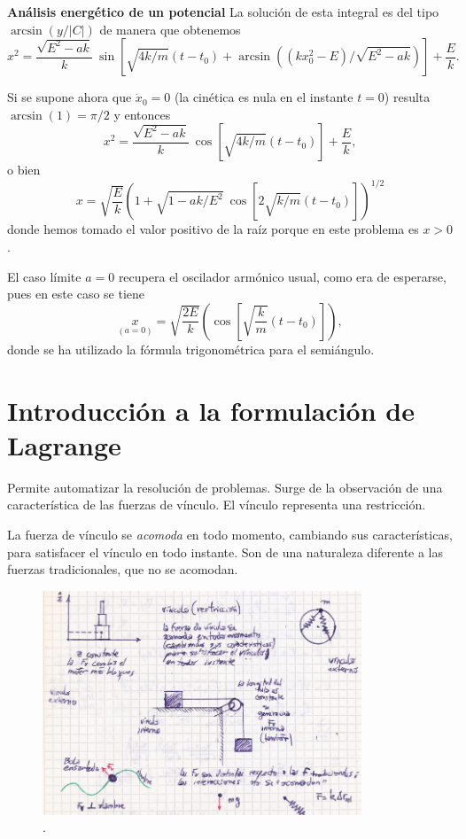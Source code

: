 \documentclass[10pt,oneside]{CBFT_book}
\begin{document}
\begin{ejemplo}{\bfseries Análisis energético de un potencial }
La solución de esta integral es del tipo $ \arcsin(y/|C|) $ de manera que obtenemos
\[
	x^2 = \frac{\sqrt{E^2 - ak}}{k} \: \sin 
	\left[ \sqrt{4k/m}(t-t_0) + \arcsin ( (kx_0^2- E)/\sqrt{E^2 -ak }) \right] + \frac{E}{k}.
\]

Si se supone ahora que $ \dot{x}_0 = 0 $ (la cinética es nula en el instante $t=0$) resulta $ \arcsin(1) = \pi/2 $ 
y entonces 
\[
	x^2 = \frac{\sqrt{E^2 - ak}}{k} \: \cos \left[ \sqrt{4k/m}(t-t_0) \right] + \frac{E}{k},
\]
o bien 
\[
	x = \sqrt{ \frac{E}{k} } \left( 1 + \sqrt{1 - ak/E^2}  \: \cos \left[ 2\sqrt{k/m}(t-t_0) \right] \right)^{1/2}
\]
donde hemos tomado el valor positivo de la raíz porque en este problema es $ x > 0 $ .

El caso límite $ a = 0 $ recupera el oscilador armónico usual, como era de esperarse, pues en este caso se tiene
\[
	\underset{(a = 0)}{x} = \sqrt{ \frac{2E}{k} } \left( \cos \left[ \sqrt{\frac{k}{m}}(t-t_0) \right] \right),
\]
donde se ha utilizado la fórmula trigonométrica para el semiángulo.

\end{ejemplo}

\section{Introducción a la formulación de Lagrange}

Permite automatizar la resolución de problemas. Surge de la observación de una característica de las fuerzas de vínculo.
El vínculo representa una restricción.

La fuerza de vínculo se {\it acomoda} en todo momento, cambiando sus características, para satisfacer el vínculo en 
todo instante. Son de una naturaleza diferente a las fuerzas tradicionales, que no se acomodan.

\begin{figure}[!ht]
	\includegraphics[width=0.85\textwidth]{images/fig_mc_vinculos_varios.jpg}	
	\caption{.}
	\label{fig_mc_vinculos_varios}
\end{figure} 
\end{document}
